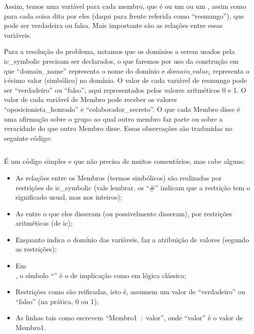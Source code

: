 Assim, temos uma variável para cada membro, que é ou um  ou um
, assim como para cada coisa dita por eles (daqui para frente referida como
``resmungo''), que pode ser verdadeira ou falsa. Mais importante são as relações entre essas
variáveis.

Para a resolução do problema, notamos que os domínios a serem usados pela ic\_symbolic precisam ser
declarados, o que faremos por uso da construção  em que ``domain\_name''
representa o nome do domínio e $domain\_value_i$ representa o i-ésimo valor (simbólico) no domínio.
O valor de cada variável de resmungo pode ser ``verdadeiro'' ou ``falso'', aqui representados pelos
valores aritméticos 0 e 1. O valor de cada variável de Membro pode receber os valores
``oposicionista\_honrado'' e ``colaborador\_secreto''. O que cada Membro disse é uma afirmação sobre
o grupo ao qual outro membro faz parte ou sobre a veracidade do que outro Membro disse. Essas
observações são traduzidas no seguinte código:

\inputminted{prolog}{../Exemplos/Cap10/prog1_pretoEbranco.ecl}

É um código simples e que não precisa de muitos comentários, mas cabe alguns:

\begin{itemize}
  \item As relações entre os Membros (termos simbólicos) são realizadas por restrições de
    ic\_symbolic (vale lembrar, os ``\#'' indicam que a restrição tem o significado usual, mas nos inteiros);
  \item As entre o que eles disseram (ou possivelmente disseram), por restrições aritméticas (de
    ic);
  \item Enquanto  indica o domínio
    das variáveis,  faz a atribuição de valores (segundo as
    restrições);
  \item Em  \\,
    o símbolo ``\codigo{=>}'' é o de implicação como em lógica clássica;
  \item Restrições como  são reificadas, isto é, assumem
    um valor de ``verdadeiro'' ou ``falso'' (na prática, 0 ou 1);
  \item As linhas tais como  escrevem ``Membro1~:~valor'',
    onde ``valor'' é o valor de Membro1.
\end{itemize}

